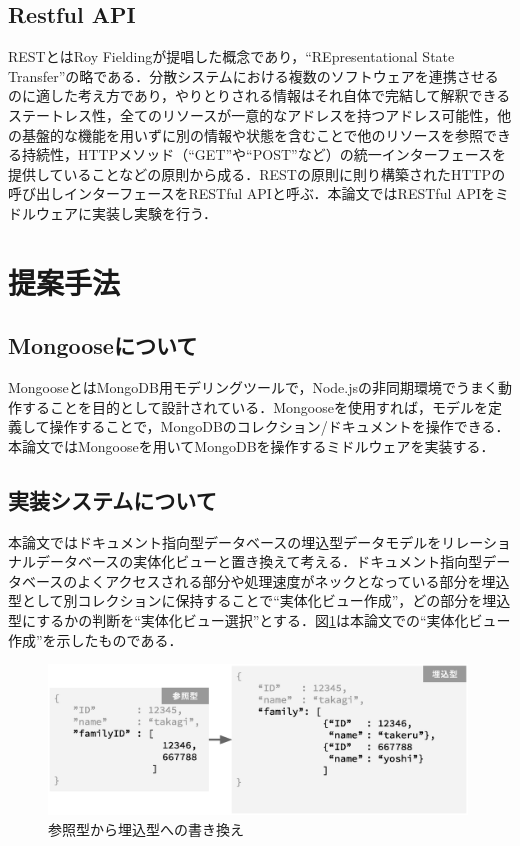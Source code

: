 \documentclass[uplatex]{deimj}
\begin{document}
\subsection{Restful API}
  RESTとはRoy Fieldingが提唱した概念であり\cite{Rest}，“REpresentational State Transfer”の略である．分散システムにおける複数のソフトウェアを連携させるのに適した考え方であり，やりとりされる情報はそれ自体で完結して解釈できるステートレス性，全てのリソースが一意的なアドレスを持つアドレス可能性，他の基盤的な機能を用いずに別の情報や状態を含むことで他のリソースを参照できる持続性，HTTPメソッド（“GET”や“POST”など）の統一インターフェースを提供していることなどの原則から成る．RESTの原則に則り構築されたHTTPの呼び出しインターフェースをRESTful APIと呼ぶ．本論文ではRESTful APIをミドルウェアに実装し実験を行う．

\section{提案手法}
\subsection{Mongooseについて}
  MongooseとはMongoDB用モデリングツールで，Node.jsの非同期環境でうまく動作することを目的として設計されている．Mongooseを使用すれば，モデルを定義して操作することで，MongoDBのコレクション/ドキュメントを操作できる\cite{Mongoose}．本論文ではMongooseを用いてMongoDBを操作するミドルウェアを実装する．

\subsection{実装システムについて}
  本論文ではドキュメント指向型データベースの埋込型データモデルをリレーショナルデータベースの実体化ビューと置き換えて考える．ドキュメント指向型データベースのよくアクセスされる部分や処理速度がネックとなっている部分を埋込型として別コレクションに保持することで“実体化ビュー作成”，どの部分を埋込型にするかの判断を“実体化ビュー選択”とする．図\ref{ReferenceToEmbed}は本論文での“実体化ビュー作成”を示したものである．
  \begin{figure}[h]
    \includegraphics[width=30em, trim=0 15em 0 2em]{src/ReferenceToEmbed.eps}
    \caption{参照型から埋込型への書き換え}
    \label{ReferenceToEmbed}
  \end{figure}
\end{document}

